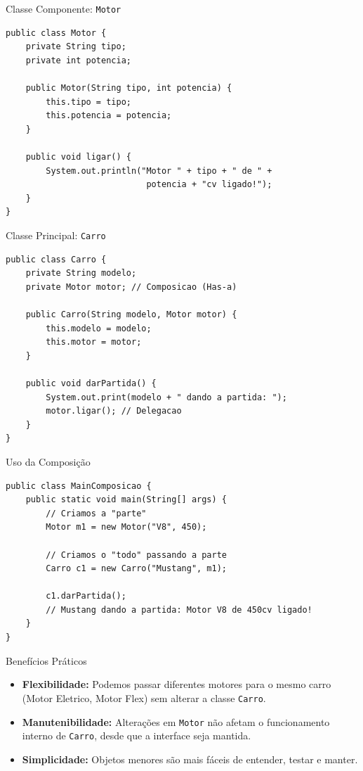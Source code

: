 \documentclass[9pt]{beamer}
\begin{document}
\begin{frame}[fragile]{Classe Componente: \texttt{Motor}}
\begin{lstlisting}
public class Motor {
    private String tipo;
    private int potencia;

    public Motor(String tipo, int potencia) {
        this.tipo = tipo;
        this.potencia = potencia;
    }

    public void ligar() {
        System.out.println("Motor " + tipo + " de " + 
                            potencia + "cv ligado!");
    }
}
\end{lstlisting}
\end{frame}

\begin{frame}[fragile]{Classe Principal: \texttt{Carro}}
\begin{lstlisting}
public class Carro {
    private String modelo;
    private Motor motor; // Composicao (Has-a)

    public Carro(String modelo, Motor motor) {
        this.modelo = modelo;
        this.motor = motor;
    }

    public void darPartida() {
        System.out.print(modelo + " dando a partida: ");
        motor.ligar(); // Delegacao
    }
}
\end{lstlisting}
\end{frame}

\begin{frame}[fragile]{Uso da Composição}
\begin{lstlisting}
public class MainComposicao {
    public static void main(String[] args) {
        // Criamos a "parte"
        Motor m1 = new Motor("V8", 450);

        // Criamos o "todo" passando a parte
        Carro c1 = new Carro("Mustang", m1);

        c1.darPartida(); 
        // Mustang dando a partida: Motor V8 de 450cv ligado!
    }
}
\end{lstlisting}
\end{frame}

\begin{frame}{Benefícios Práticos}
    \begin{itemize}
        \item \textbf{Flexibilidade:} Podemos passar diferentes motores para o mesmo carro (Motor Eletrico, Motor Flex) sem alterar a classe \texttt{Carro}.
        \item \textbf{Manutenibilidade:} Alterações em \texttt{Motor} não afetam o funcionamento interno de \texttt{Carro}, desde que a interface seja mantida.
        \item \textbf{Simplicidade:} Objetos menores são mais fáceis de entender, testar e manter.
    \end{itemize}
\end{frame}
\end{document}
